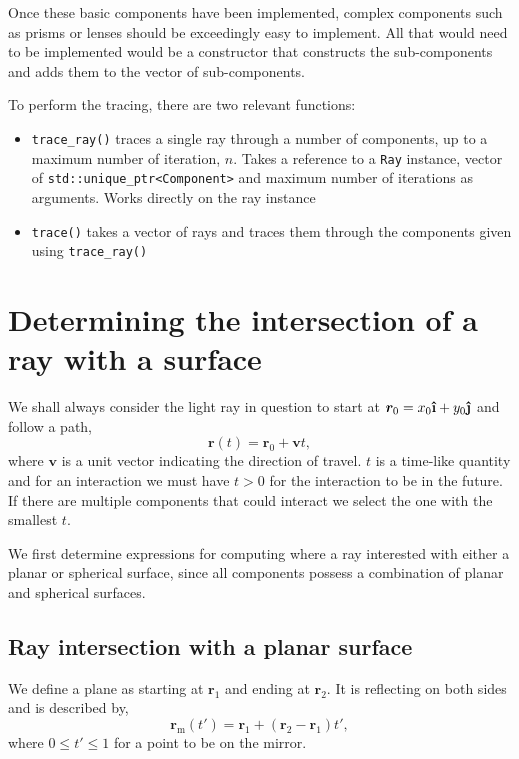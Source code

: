 \documentclass{article}
\let\vec \bm
\newcommand{\uveci}{{\bm{\hat{\textnormal{\bfseries\i}}}}}
\newcommand{\uvecj}{{\bm{\hat{\textnormal{\bfseries\j}}}}}
\begin{document}
Once these basic components have been implemented, complex components such as prisms or lenses should be exceedingly easy to implement. All that would need to be implemented would be a constructor that constructs the sub-components and adds them to the vector of sub-components.

To perform the tracing, there are two relevant functions:
\begin{itemize}
    \item \texttt{trace\_ray()} traces a single ray through a number of components, up to a maximum number of iteration, $n$. Takes a reference to a \texttt{Ray} instance, vector of \texttt{std::unique\_ptr<Component>} and maximum number of iterations as arguments. Works directly on the ray instance
    \item \texttt{trace()} takes a vector of rays and traces them through the components given using \texttt{trace\_ray()}
\end{itemize}

\section{Determining the intersection of a ray with a surface}
We shall always consider the light ray in question to start at $\vec{r}_0 = x_0 \uveci + y_0 \uvecj$ and follow a path,
\begin{equation}
    \vec{r}(t) = \vec{r}_0 + \vec{v}t,
\end{equation}
where $\vec{v}$ is a unit vector indicating the direction of travel. $t$ is a time-like quantity and for an interaction we must have $t > 0$ for the interaction to be in the future. If there are multiple components that could interact we select the one with the smallest $t$.

We first determine expressions for computing where a ray interested with either a planar or spherical surface, since all components possess a combination of planar and spherical surfaces.

\subsection{Ray intersection with a planar surface}
We define a plane as starting at $\vec{r}_1$ and ending at $\vec{r}_2$. It is reflecting on both sides and is described by,
\begin{equation}
    \vec{r}_\mathrm{m}(t')
    =
    \vec{r}_1 + (\vec{r}_2 - \vec{r}_1) t',
\end{equation}
where $0 \le t' \le 1$ for a point to be on the mirror.
\end{document}
